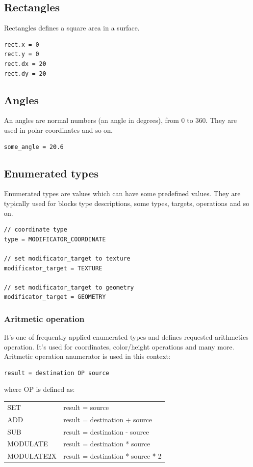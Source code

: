\documentclass[9pt]{article}
\begin{document}
\subsection{Rectangles}

Rectangles defines a square area in a surface.
\begin{verbatim}
rect.x = 0
rect.y = 0
rect.dx = 20
rect.dy = 20
\end{verbatim}

\subsection{Angles}

An angles are normal numbers (an angle in degrees), from 0 to 360. 
They are used in polar coordinates and so on.
\begin{verbatim}
some_angle = 20.6
\end{verbatim}

\subsection{Enumerated types}

Enumerated types are values which can have some predefined values. 
They are typically used for blocks type descriptions, some types,
targets, operations and so on.
\begin{verbatim}
// coordinate type
type = MODIFICATOR_COORDINATE

// set modificator_target to texture
modificator_target = TEXTURE

// set modificator_target to geometry
modificator_target = GEOMETRY
\end{verbatim}

\subsubsection{Aritmetic operation}
It's one of frequently applied enumerated types and defines requested arithmetics
operation. It's used for coordinates, color/height operations and many more. Aritmetic 
operation anumerator is used in this context: 
\begin{verbatim}
result = destination OP source
\end{verbatim}
where OP is defined as: 
\begin{center}
\begin{tabular}{|l||l|}
\hline
SET & result = source\\
ADD & result = destination + source\\
SUB & result = destination - source\\
MODULATE & result = destination * source\\
MODULATE2X & result = destination * source * 2\\
\hline
\end{tabular}
\end{center}
\end{document}
